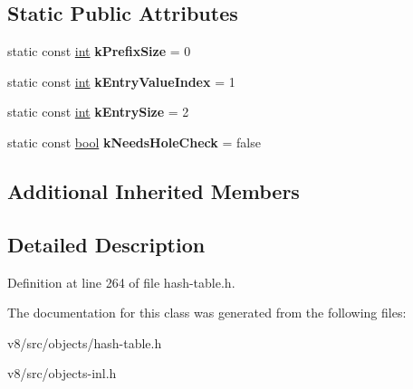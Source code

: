 \subsection*{Static Public Attributes}
\begin{DoxyCompactItemize}
\item 
\mbox{\label{classv8_1_1internal_1_1ObjectHashTableShape_aa9507cf40bf2390bcffdf347c8fc26a2}} 
static const \mbox{\hyperlink{classint}{int}} {\bfseries k\+Prefix\+Size} = 0
\item 
\mbox{\label{classv8_1_1internal_1_1ObjectHashTableShape_acf597b95feb7d523c3728ff05d1ece74}} 
static const \mbox{\hyperlink{classint}{int}} {\bfseries k\+Entry\+Value\+Index} = 1
\item 
\mbox{\label{classv8_1_1internal_1_1ObjectHashTableShape_ae2fbbf6aa03504427fe4bb77279d3f4f}} 
static const \mbox{\hyperlink{classint}{int}} {\bfseries k\+Entry\+Size} = 2
\item 
\mbox{\label{classv8_1_1internal_1_1ObjectHashTableShape_ac2326d85b1d191324d83eedd8133008b}} 
static const \mbox{\hyperlink{classbool}{bool}} {\bfseries k\+Needs\+Hole\+Check} = false
\end{DoxyCompactItemize}
\subsection*{Additional Inherited Members}


\subsection{Detailed Description}


Definition at line 264 of file hash-\/table.\+h.



The documentation for this class was generated from the following files\+:\begin{DoxyCompactItemize}
\item 
v8/src/objects/hash-\/table.\+h\item 
v8/src/objects-\/inl.\+h\end{DoxyCompactItemize}
